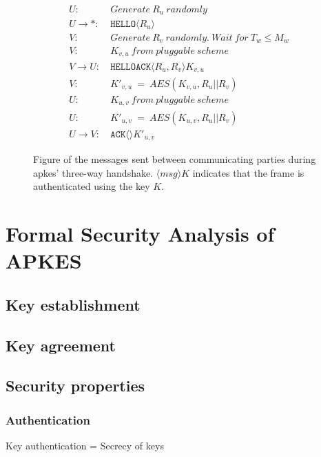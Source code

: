 \begin{figure}[h]
\begin{tcolorbox}[title=Three-way handshake in APKES]
\begin{align*}
U:\ & Generate\ R_u\ randomly\\
U \rightarrow *:\ & \texttt{HELLO}\langle{R_u}\rangle{}\\
V:\ & Generate\ R_v\ randomly.\ Wait\ for\ T_w \leq M_w\\
V:\ & K_{v,u}\ from\ pluggable\ scheme\\
V \rightarrow U:\ & \texttt{HELLOACK}\langle{R_u, R_v}\rangle{K_{v,u}}\\
V:\ & K'_{v,u}\ =\ AES(K_{v,u}, R_u || R_v)\\
U:\ & K_{u,v}\ from\ pluggable\ scheme\\
U:\ & K'_{u,v}\ =\ AES(K_{u,v}, R_u || R_v)\\
U \rightarrow V:\ & \texttt{ACK}\langle{}\rangle{K'_{u,v}}
\end{align*}
\end{tcolorbox}
\caption{Figure of the messages sent between communicating parties during \gls{apkes}' three-way handshake. $\langle{msg}\rangle{K}$ indicates that the frame is authenticated using the key $K$.}
\label{fig:apkes-handshake}
\end{figure}


\section{Formal Security Analysis of APKES}


\subsection{Key establishment}

\subsection{Key agreement}

\subsection{Security properties}

\subsubsection{Authentication}

Key authentication = Secrecy of keys

